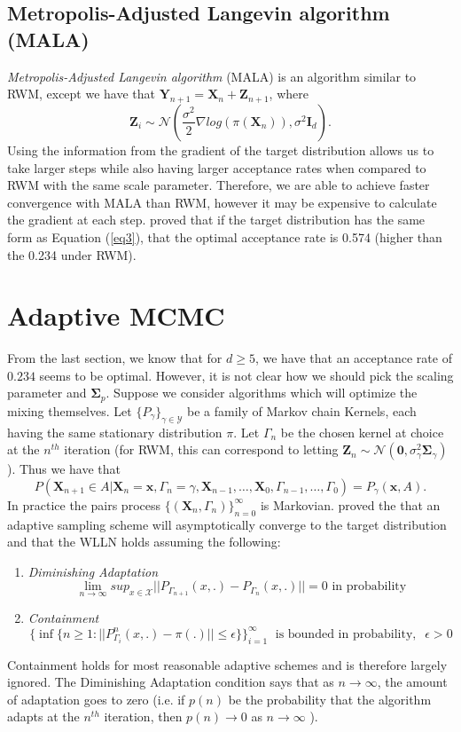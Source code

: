 \documentclass[twoside]{article}
\begin{document}
\subsection{Metropolis-Adjusted Langevin algorithm (MALA)}
\textit{Metropolis-Adjusted Langevin algorithm} (MALA) is an algorithm similar to RWM, except we have that $\mathbf{Y}_{n+1} = \mathbf{X}_n + \mathbf{Z}_{n+1}$, where $$\mathbf{Z}_i \sim \mathcal{N}(\frac{\sigma^2}{2}\nabla log( \pi(\mathbf{X}_n)), \sigma^2\mathbf{I}_d).$$
Using the information from the gradient of the target distribution allows us to take larger steps while also having larger acceptance rates when compared to RWM with the same scale parameter. Therefore, we are able to achieve faster convergence with MALA than RWM, however it may be expensive to calculate the gradient at each step. \citet{roberts1998optimal} proved that if the target distribution has the same form as Equation (\ref{eq3}), that the optimal acceptance rate is 0.574 (higher than the 0.234 under RWM).

\section{Adaptive MCMC}
From the last section, we know that for $d \ge 5$, we have that an acceptance rate of $0.234$ seems to be optimal. However, it is not clear how we should pick the scaling parameter and $\boldsymbol{\Sigma}_p$. Suppose we consider algorithms which will optimize the mixing themselves. Let $\{P_{\gamma}\}_{\gamma \in \mathcal{Y}}$ be a family of Markov chain Kernels, each having the same stationary distribution $\pi$. Let $\Gamma_n$ be the chosen kernel at choice at the $n^{th}$ iteration (for RWM, this can correspond to letting $\mathbf{Z}_{n} \sim \mathcal{N}(\mathbf{0}, \sigma^2_\gamma \boldsymbol{\Sigma}_\gamma)$). Thus we have that
$$P(\mathbf{X}_{n+1} \in A| \mathbf{X}_n = \mathbf{x}, \Gamma_n = \gamma, \mathbf{X}_{n-1}, \dots, \mathbf{X}_{0}, \Gamma_{n-1}, \dots, \Gamma_0) = P_{\gamma}(\mathbf{x},A).$$
In practice the pairs process $\{(\mathbf{X}_n, \Gamma_n)\}_{n=0}^\infty$ is Markovian.
\citet{roberts2007coupling} proved the that an adaptive sampling scheme will asymptotically converge to the target distribution and that the WLLN holds assuming the following:
\begin{enumerate}
	\item \textit{Diminishing Adaptation}
	$$\lim_{n \rightarrow \infty}sup_{x \in \mathcal{X}}||P_{\Gamma_{n+1}}(x,.) - P_{\Gamma_n}(x,.)|| = 0 \text{ in probability}$$
	\item \textit{Containment}
	$$\{\inf\{n\ge 1: ||P^n_{\Gamma_i}(x, .) - \pi(.)|| \le \epsilon\}\}_{i=1}^\infty \;\text{ is bounded in probability},  \;\; \epsilon > 0$$
\end{enumerate}
Containment holds for most reasonable adaptive schemes and is therefore largely ignored. The Diminishing Adaptation condition says that as $n \rightarrow \infty$, the amount of adaptation goes to zero (i.e. if $p(n)$ be the probability that the algorithm adapts at the $n^{th}$ iteration, then  $p(n) \rightarrow 0$ as $n \rightarrow \infty$ ).
\end{document}
